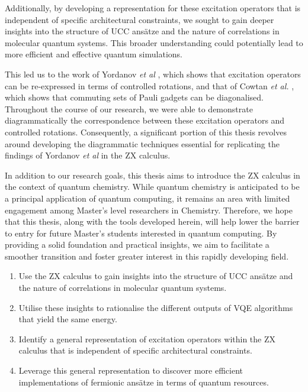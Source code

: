Additionally, by developing a representation for these excitation operators that is independent of specific architectural constraints, we sought to gain deeper insights into the structure of UCC ansätze and the nature of correlations in molecular quantum systems. This broader understanding could potentially lead to more efficient and effective quantum simulations.

This led us to the work of Yordanov \textit{et al} \cite{Yordanov2020}, which shows that excitation operators can be re-expressed in terms of controlled rotations, and that of Cowtan \textit{et al.} \cite{Cowtan2020}, which shows that commuting sets of Pauli gadgets can be diagonalised. Throughout the course of our research, we were able to demonstrate diagrammatically the correspondence between these excitation operators and controlled rotations. Consequently, a significant portion of this thesis revolves around developing the diagrammatic techniques essential for replicating the findings of Yordanov \textit{et al} in the ZX calculus.

In addition to our research goals, this thesis aims to introduce the ZX calculus in the context of quantum chemistry. While quantum chemistry is anticipated to be a principal application of quantum computing, it remains an area with limited engagement among Master's level researchers in Chemistry. Therefore, we hope that this thesis, along with the tools developed herein, will help lower the barrier to entry for future Master's students interested in quantum computing. By providing a solid foundation and practical insights, we aim to facilitate a smoother transition and foster greater interest in this rapidly developing field.

\begin{enumerate}[itemsep=-5pt]
\item Use the ZX calculus to gain insights into the structure of UCC ansätze and the nature of correlations in molecular quantum systems.
\item Utilise these insights to rationalise the different outputs of VQE algorithms that yield the same energy.
\item Identify a general representation of excitation operators within the ZX calculus that is independent of specific architectural constraints.
\item Leverage this general representation to discover more efficient implementations of fermionic ansätze in terms of quantum resources.
\end{enumerate}

